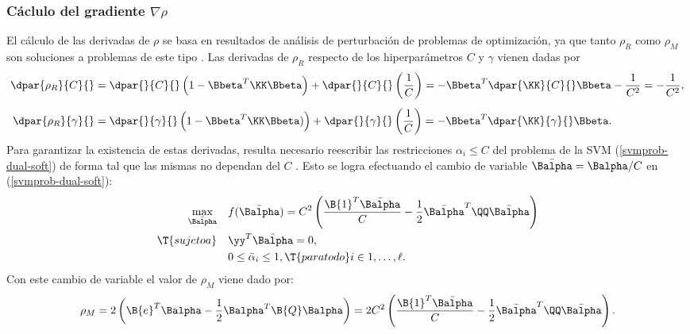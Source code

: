 %
\subsubsection{Cáclulo del gradiente $\nabla\rho$}
%
El cálculo de las derivadas de $\rho$ se basa en resultados de
análisis de perturbación de problemas de optimización, ya que tanto
$\rho_R$ como $\rho_M$ son soluciones a problemas de este tipo
\cite{chung}.
Las derivadas de $\rho_R$ respecto de los hiperparámetros $C$ y
$\gamma$ vienen dadas por
%
\begin{align}
%
  \dpar{\rho_R}{C}{} &
  = \dpar{}{C}{}\left(1-\Bbeta^T\KK\Bbeta\right)
       + \dpar{}{C}{}\left(\frac{1}{C}\right)
  = -\Bbeta^T \dpar{\KK}{C}{}\Bbeta - \frac{1}{C^2}
  = -\frac{1}{C^2}, \\[1ex]
%
  \dpar{\rho_R}{\gamma}{} &
  = \dpar{}{\gamma}{}\left(1-\Bbeta^T\KK\Bbeta)\right)
       + \dpar{}{\gamma}{}\left(\frac{1}{C}\right)
  = -\Bbeta^T \dpar{\KK}{\gamma}{}\Bbeta.
%
\end{align}
%
Para garantizar la existencia de estas derivadas, resulta necesario
reescribir las restricciones $\alpha_i\leq{}C$ del problema de la SVM
(\ref{svmprob-dual-soft}) de forma tal que las mismas no dependan del
\hparam{} $C$ \cite{chung}.
Esto se logra efectuando el cambio de variable
$\bar{\Balpha}=\Balpha/C$ en (\ref{svmprob-dual-soft}):
%
\begin{align}
\begin{split}
    \max_{\bar{\Balpha}}\quad&
    f(\bar{\Balpha}) = C^2 \left( \frac{\B{1}^T\bar{\Balpha}}{C}
    -\frac{1}{2}\bar{\Balpha}^T\QQ\bar{\Balpha}\right)\\
    \T{sujeto a}\quad & \yy^T\bar{\Balpha} = 0, \\
    & 0\leq\bar{\alpha}_i\leq 1,
    \T{ para todo } i\in {1,\ldots,\ell }.
\end{split}
\end{align}
%
Con este cambio de variable el valor de $\rho_M$ viene dado por:
%
\begin{align}
  \label{eq:rmb-alpha-equiv}
  \rho_M=2\left(\B{e}^T\Balpha-\frac{1}{2}\Balpha^T\B{Q}\Balpha\right)
  = 2C^2\left(\frac{\B{1}^T\bar{\Balpha}}{C} -
  \frac{1}{2}\bar{\Balpha}^T\QQ\bar{\Balpha}\right).
\end{align}
%

